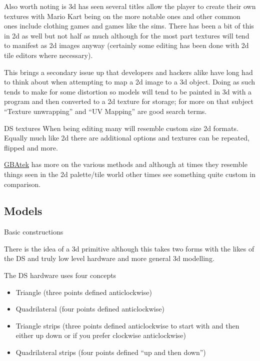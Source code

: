\documentclass[
]{book}
\providecommand{\tightlist}{%
  \setlength{\itemsep}{0pt}\setlength{\parskip}{0pt}}
\begin{document}
Also worth noting is 3d has seen several titles allow the player to create their own textures with Mario Kart being on the more notable ones and other common ones include clothing games and games like the sims. There has been a bit of this in 2d as well but not half as much although for the most part textures will tend to manifest as 2d images anyway (certainly some editing has been done with 2d tile editors where necessary).

This brings a secondary issue up that developers and hackers alike have long had to think about when attempting to map a 2d image to a 3d object. Doing as such tends to make for some distortion so models will tend to be painted in 3d with a program and then converted to a 2d texture for storage; for more on that subject ``Texture unwrapping'' and ``UV Mapping'' are good search terms.

DS textures When being editing many will resemble custom size 2d formats. Equally much like 2d there are additional options and textures can be repeated, flipped and more.

\href{http://problemkaputt.de/gbatek.htm\#ds3dtextureattributes}{GBAtek} has more on the various methods and although at times they resemble things seen in the 2d palette/tile world other times see something quite custom in comparison.

\hypertarget{models}{%
\subsection{Models}\label{models}}

Basic constructions

There is the idea of a 3d primitive although this takes two forms with the likes of the DS and truly low level hardware and more general 3d modelling.

The DS hardware uses four concepts

\begin{itemize}
\tightlist
\item
  Triangle (three points defined anticlockwise)
\item
  Quadrilateral (four points defined anticlockwise)
\item
  Triangle strips (three points defined anticlockwise to start with and then either up down or if you prefer clockwise anticlockwise)
\item
  Quadrilateral strips (four points defined ``up and then down'')
\end{itemize}
\end{document}
